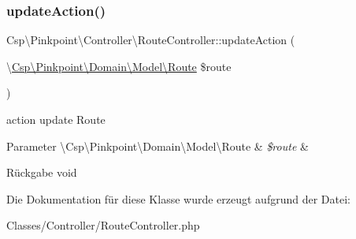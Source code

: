 \subsubsection{\texorpdfstring{update\+Action()}{updateAction()}}
{\footnotesize\ttfamily Csp\textbackslash{}\+Pinkpoint\textbackslash{}\+Controller\textbackslash{}\+Route\+Controller\+::update\+Action (\begin{DoxyParamCaption}\item[{\textbackslash{}\hyperlink{classCsp_1_1Pinkpoint_1_1Domain_1_1Model_1_1Route}{Csp\textbackslash{}\+Pinkpoint\textbackslash{}\+Domain\textbackslash{}\+Model\textbackslash{}\+Route}}]{\$route }\end{DoxyParamCaption})}

action update Route


\begin{DoxyParams}[1]{Parameter}
\textbackslash{}\+Csp\textbackslash{}\+Pinkpoint\textbackslash{}\+Domain\textbackslash{}\+Model\textbackslash{}\+Route & {\em \$route} & \\
\hline
\end{DoxyParams}
\begin{DoxyReturn}{Rückgabe}
void 
\end{DoxyReturn}


Die Dokumentation für diese Klasse wurde erzeugt aufgrund der Datei\+:\begin{DoxyCompactItemize}
\item 
Classes/\+Controller/Route\+Controller.\+php\end{DoxyCompactItemize}
